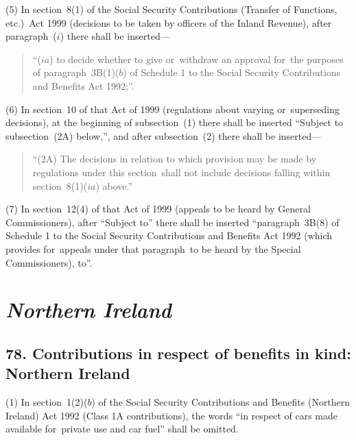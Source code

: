 \documentclass[12pt,a4paper]{article}
\begin{document}
(5) In section~8(1)  of the Social Security Contributions (Transfer of Functions, etc.)\ Act 1999 (decisions to be taken by officers of the Inland Revenue), after paragraph~($i$)  there shall be inserted—
\begin{quotation}
“($ia$) to decide whether to give or~withdraw an approval for~the purposes of paragraph~3B(1)($b$)  of Schedule 1 to the Social Security Contributions and Benefits Act 1992;”.
\end{quotation}

(6) In section~10 of that Act of 1999 (regulations about varying or~superseding decisions), at the beginning of subsection~(1)  there shall be inserted “Subject to subsection~(2A)  below,”, and after subsection~(2)  there shall be inserted—
\begin{quotation}
“(2A) The decisions in relation to which provision may be made by regulations under this section~shall not include decisions falling within section~8(1)($ia$) above.”
\end{quotation}

(7) In section~12(4)  of that Act of 1999 (appeals to be heard by General Commissioners), after “Subject to” there shall be inserted “paragraph~3B(8)  of Schedule 1 to the Social Security Contributions and Benefits Act 1992 (which provides for~appeals under that paragraph~to be heard by the Special Commissioners), to”.

\section{\itshape Northern Ireland}

\subsection{78. Contributions in respect of benefits in kind: Northern Ireland}

(1) In section~1(2)($b$)  of the Social Security Contributions and Benefits (Northern Ireland) Act 1992 (Class 1A contributions), the words “in respect of cars made available for~private use and car fuel” shall be omitted.
\end{document}
